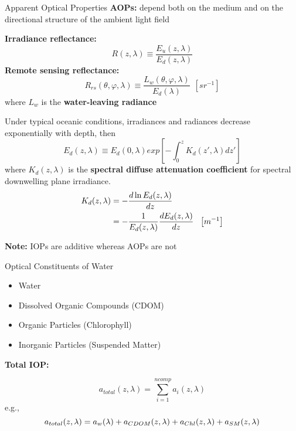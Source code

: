 {Apparent Optical Properties}
\textbf{AOPs:} depend both on the medium and on the directional structure of the ambient light field

\vspace{\baselineskip}

\textbf{Irradiance reflectance:}
\begin{equation}
	R(z,\lambda)\equiv \frac{E_u(z,\lambda)}{E_d(z,\lambda)}
\end{equation}
\textbf{Remote sensing reflectance:}
\begin{equation}
	R_{rs}(\theta,\varphi,\lambda)\equiv \frac{L_w(\theta,\varphi,\lambda)}{E_d(\lambda)}~~\left[sr^{-1} \right]
\end{equation}
where $L_w$ is the \textbf{water-leaving radiance}

Under typical oceanic conditions, irradiances and radiances decrease exponentially with depth, then
\begin{equation}
	E_d(z,\lambda)\equiv E_d(0,\lambda) exp\left[-\int_0^{z}K_d(z',\lambda)dz'\right]
\end{equation}
where $K_d(z,\lambda)$ is the \textbf{spectral diffuse attenuation coefficient} for spectral downwelling plane irradiance. 
\begin{align}
	K_d(z,\lambda) 	&=- \frac{d\ln E_d(z,\lambda)}{dz} \notag \\
					&=-\frac{1}{E_d(z,\lambda)}\frac{dE_d(z,\lambda)}{dz} ~~\left[m^{-1} \right]
\end{align}

\textbf{Note:} IOPs are additive whereas AOPs are not

{Optical Constituents of Water}
\begin{itemize}
	\item Water
	\item Dissolved Organic Compounds (CDOM)
	\item Organic Particles (Chlorophyll)
	\item Inorganic Particles (Suspended Matter)
\end{itemize}

\textbf{Total IOP:}

\begin{equation}
	a_{total}(z,\lambda) = \sum_{i=1}^{ncomp} a_i(z,\lambda)
\end{equation}
e.g.,
\begin{equation}
	a_{total}(z,\lambda) =  a_w(\lambda) +a_{CDOM}(z,\lambda)+ a_{Chl}(z,\lambda)+a_{SM}(z,\lambda) \notag
\end{equation}


